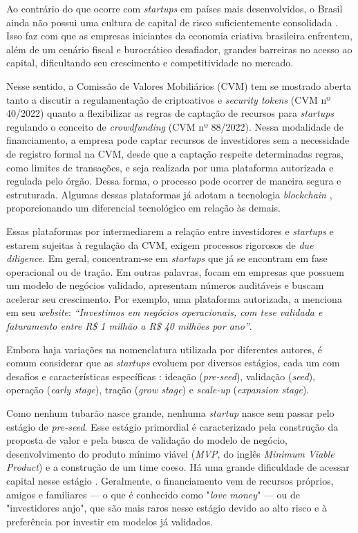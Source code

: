\documentclass[12pt, a4paper, oneside, openright, chapter=TITLE]{abntex2}
\begin{document}
Ao contrário do que ocorre com \textit{startups} em países mais desenvolvidos, o Brasil ainda não possui uma cultura de capital de risco suficientemente consolidada \cite{lazzarini2018}. Isso faz com que as empresas iniciantes da economia criativa brasileira enfrentem, além de um cenário fiscal e burocrático desafiador, grandes barreiras no acesso ao capital, dificultando seu crescimento e competitividade no mercado.

Nesse sentido, a Comissão de Valores Mobiliários (CVM) tem se mostrado aberta tanto a discutir a regulamentação de criptoativos e \textit{security tokens} (CVM nº 40/2022) quanto a flexibilizar as regras de captação de recursos para \textit{startups} regulando o conceito de \textit{crowdfunding} (CVM nº 88/2022). Nessa modalidade de financiamento, a empresa pode captar recursos de investidores sem a necessidade de registro formal na CVM, desde que a captação respeite determinadas regras, como limites de transações, e seja realizada por uma plataforma autorizada e regulada pelo órgão. Dessa forma, o processo pode ocorrer de maneira segura e estruturada. Algumas dessas plataformas já adotam a tecnologia \textit{blockchain} \cite{ruffoni2020}, proporcionando um diferencial tecnológico em relação às demais.

Essas plataformas por intermediarem a relação entre investidores e \textit{startups} e estarem sujeitas à regulação da CVM, exigem processos rigorosos de \textit{due diligence}. Em geral, concentram-se em \textit{startups} que já se encontram em fase operacional ou de tração. Em outras palavras, focam em empresas que possuem um modelo de negócios validado, apresentam números auditáveis e buscam acelerar seu crescimento. Por exemplo, uma plataforma autorizada, a  menciona em seu \textit{website}: \textit{“Investimos em negócios operacionais, com tese validada e faturamento entre R\$ 1 milhão a R\$ 40 milhões por ano”}.

Embora haja variações na nomenclatura utilizada por diferentes autores, é comum considerar que as \textit{startups} evoluem por diversos estágios, cada um com desafios e características específicas \cite{sebrae2023}: ideação (\textit{pre-seed}), validação (\textit{seed}), operação (\textit{early stage}), tração (\textit{grow stage}) e \textit{scale-up} (\textit{expansion stage}).

Como nenhum tubarão nasce grande, nenhuma \textit{startup} nasce sem passar pelo estágio de   \textit{pre-seed}. Esse estágio primordial é caracterizado pela construção da proposta de valor e pela busca de validação do modelo de negócio, desenvolvimento do produto mínimo viável (\textit{MVP}, do inglês \textit{Minimum Viable Product}) e a construção de um time coeso. Há uma grande dificuldade de acessar capital nesse estágio \cite{maringa2024}. Geralmente, o financiamento vem de recursos próprios, amigos e familiares — o que é conhecido como "\textit{love money}" — ou de "investidores anjo", que são mais raros nesse estágio devido ao alto risco e à preferência por investir em modelos já validados.
\end{document}
